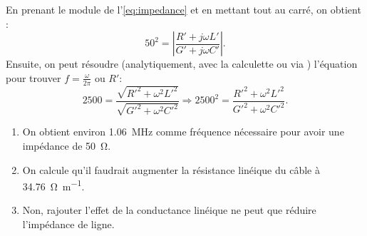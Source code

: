 \documentclass [a4paper, 11pt] {article}
\begin{document}
    \begin{reponse}
        En prenant le module de l'\autoref{eq:impedance} et en mettant tout au carré, on obtient :
        \begin{equation}
            50^2 =\left|\frac{R' + j \omega L'}{G' + j \omega C'}\right|.
        \end{equation}
        Ensuite, on peut résoudre (analytiquement, avec la calculette ou via ) l'équation pour trouver $f=\frac{\omega}{2\pi}$ ou $R'$:
        \begin{equation}
            2500 =\frac{\sqrt{R'^2 + \omega^2 L'^2}}{\sqrt{G'^2 + \omega^2 C'^2}} \Rightarrow 2500^2 =\frac{R'^2 + \omega^2 L'^2}{G'^2 + \omega^2 C'^2}.
        \end{equation}
        \begin{enumerate}
            \item On obtient environ \SI{1.06}{\mega\hertz} comme fréquence nécessaire pour avoir une impédance de \SI{50}{\ohm}.
            \item On calcule qu'il faudrait augmenter la résistance linéique du câble à \SI{34.76}{\ohm\per\meter}.
            \item Non, rajouter l'effet de la conductance linéique ne peut que réduire l'impédance de ligne.
        \end{enumerate}
    \end{reponse}
    
\end{document}
